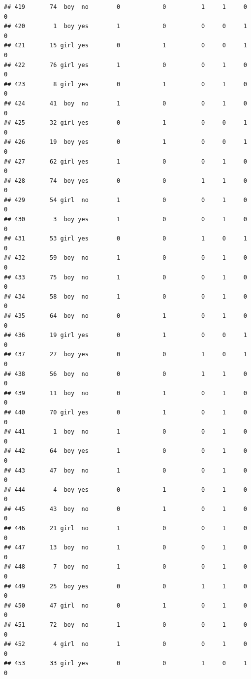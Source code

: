 \documentclass[man]{apa6}
\begin{document}
\begin{verbatim}
## 419       74  boy  no        0            0          1     1     0     0
## 420        1  boy yes        1            0          0     0     1     0
## 421       15 girl yes        0            1          0     0     1     0
## 422       76 girl yes        1            0          0     1     0     0
## 423        8 girl yes        0            1          0     1     0     0
## 424       41  boy  no        1            0          0     1     0     0
## 425       32 girl yes        0            1          0     0     1     0
## 426       19  boy yes        0            1          0     0     1     0
## 427       62 girl yes        1            0          0     1     0     0
## 428       74  boy yes        0            0          1     1     0     0
## 429       54 girl  no        1            0          0     1     0     0
## 430        3  boy yes        1            0          0     1     0     0
## 431       53 girl yes        0            0          1     0     1     0
## 432       59  boy  no        1            0          0     1     0     0
## 433       75  boy  no        1            0          0     1     0     0
## 434       58  boy  no        1            0          0     1     0     0
## 435       64  boy  no        0            1          0     1     0     0
## 436       19 girl yes        0            1          0     0     1     0
## 437       27  boy yes        0            0          1     0     1     0
## 438       56  boy  no        0            0          1     1     0     0
## 439       11  boy  no        0            1          0     1     0     0
## 440       70 girl yes        0            1          0     1     0     0
## 441        1  boy  no        1            0          0     1     0     0
## 442       64  boy yes        1            0          0     1     0     0
## 443       47  boy  no        1            0          0     1     0     0
## 444        4  boy yes        0            1          0     1     0     0
## 445       43  boy  no        0            1          0     1     0     0
## 446       21 girl  no        1            0          0     1     0     0
## 447       13  boy  no        1            0          0     1     0     0
## 448        7  boy  no        1            0          0     1     0     0
## 449       25  boy yes        0            0          1     1     0     0
## 450       47 girl  no        0            1          0     1     0     0
## 451       72  boy  no        1            0          0     1     0     0
## 452        4 girl  no        1            0          0     1     0     0
## 453       33 girl yes        0            0          1     0     1     0

\end{verbatim}
\end{document}
